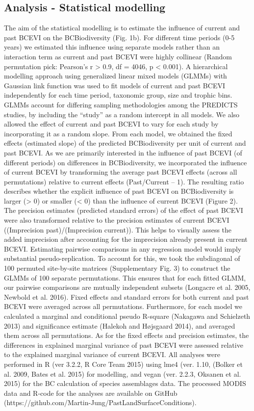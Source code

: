 \subsection{Analysis - Statistical modelling}
The aim of the statistical modelling is to estimate the influence of current and past BCEVI on the BCBiodiversity (Fig. 1b). For different time periods (0-5 years) we estimated this influence using separate models rather than an interaction term as current and past BCEVI were highly collinear (Random permutation pick: Pearson’s r > 0.9, df = 4046, p < 0.001). A hierarchical modelling approach using generalized linear mixed models (GLMMs) with Gaussian link function was used to fit models of current and past BCEVI independently for each time period, taxonomic group, size and trophic bins. GLMMs account for differing sampling methodologies among the PREDICTS studies, by including the “study” as a random intercept in all models. We also allowed the effect of current and past BCEVI to vary for each study by incorporating it as a random slope. From each model, we obtained the fixed effects (estimated slope) of the predicted BCBiodiversity per unit of current and past BCEVI.
	As we are primarily interested in the influence of past BCEVI (of different periods) on differences in BCBiodiversity, we incorporated the influence of current BCEVI by transforming the average past BCEVI effects (across all permutations) relative to current effects (Past/Current – 1). The resulting ratio describes whether the explicit influence of past BCEVI on BCBiodiversity is larger (> 0) or smaller (< 0) than the influence of current BCEVI (Figure 2). The precision estimates (predicted standard errors) of the effect of past BCEVI were also transformed relative to the precision estimates of current BCEVI ((Imprecision past)/(Imprecision current)). This helps to visually assess the added imprecision after accounting for the imprecision already present in current BCEVI. 
	Estimating pairwise comparisons in any regression model would imply substantial pseudo-replication. To account for this, we took the subdiagonal of 100 permuted site-by-site matrices (Supplementary Fig. 3) to construct the GLMMs of 100 separate permutations. This ensures that for each fitted GLMM, our pairwise comparisons are mutually independent subsets (Longacre et al. 2005, Newbold et al. 2016). Fixed effects and standard errors for both current and past BCEVI were averaged across all permutations. Furthermore, for each model we calculated a marginal and conditional pseudo R-square (Nakagawa and Schielzeth 2013) and significance estimate (Halekoh and Højsgaard 2014), and averaged them across all permutations. As for the fixed effects and precision estimates, the differences in explained marginal variance of past BCEVI were assessed relative to the explained marginal variance of current BCEVI.
	All analyses were performed in R (ver 3.2.2, R Core Team 2015) using lme4 (ver. 1.10, (Bolker et al. 2009, Bates et al. 2015) for modelling, and vegan (ver. 2.2.3, Oksanen et al. 2015) for the BC calculation of species assemblages data. The processed MODIS data and R-code for the analyses are available on GitHub (https://github.com/Martin-Jung/PastLandSurfaceConditions). 

